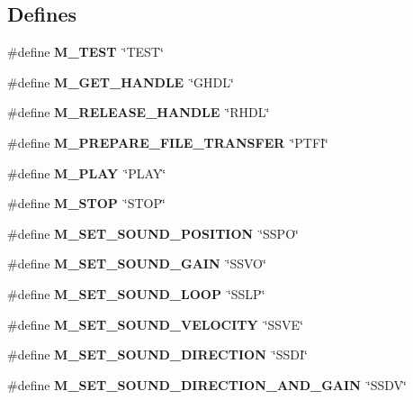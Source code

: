 \subsection*{Defines}
\begin{CompactItemize}
\item 
\#define \textbf{M\_\-TEST}~\char`\"{}TEST\char`\"{}\label{OASMessage_8h_b5476f305b74964194549cbbef6b54c7}

\item 
\#define \textbf{M\_\-GET\_\-HANDLE}~\char`\"{}GHDL\char`\"{}\label{OASMessage_8h_10bc510abb35279ac17d3245616aaa90}

\item 
\#define \textbf{M\_\-RELEASE\_\-HANDLE}~\char`\"{}RHDL\char`\"{}\label{OASMessage_8h_fe0be4adc6be4d4b136e4b18f92ad113}

\item 
\#define \textbf{M\_\-PREPARE\_\-FILE\_\-TRANSFER}~\char`\"{}PTFI\char`\"{}\label{OASMessage_8h_420ebd5625f23fc3466845ac88341e67}

\item 
\#define \textbf{M\_\-PLAY}~\char`\"{}PLAY\char`\"{}\label{OASMessage_8h_5bad54dc89b93f5c01ca350522d63d7d}

\item 
\#define \textbf{M\_\-STOP}~\char`\"{}STOP\char`\"{}\label{OASMessage_8h_8a607b4f8e567166aaeacb45781128df}

\item 
\#define \textbf{M\_\-SET\_\-SOUND\_\-POSITION}~\char`\"{}SSPO\char`\"{}\label{OASMessage_8h_2df2b60ee1bcf683d64af42ce3c7abae}

\item 
\#define \textbf{M\_\-SET\_\-SOUND\_\-GAIN}~\char`\"{}SSVO\char`\"{}\label{OASMessage_8h_50d8b05c549378ca3717ba778a070501}

\item 
\#define \textbf{M\_\-SET\_\-SOUND\_\-LOOP}~\char`\"{}SSLP\char`\"{}\label{OASMessage_8h_0ee794307a10af3ae064dc5383d765d7}

\item 
\#define \textbf{M\_\-SET\_\-SOUND\_\-VELOCITY}~\char`\"{}SSVE\char`\"{}\label{OASMessage_8h_b3592448128d311d03534149ff29bfe0}

\item 
\#define \textbf{M\_\-SET\_\-SOUND\_\-DIRECTION}~\char`\"{}SSDI\char`\"{}\label{OASMessage_8h_b2247a5024adc1c68c2fcc6fd21019f8}

\item 
\#define \textbf{M\_\-SET\_\-SOUND\_\-DIRECTION\_\-AND\_\-GAIN}~\char`\"{}SSDV\char`\"{}\label{OASMessage_8h_e81e71ea59c1df5f45434f1ec6b95509}


\end{CompactItemize}

